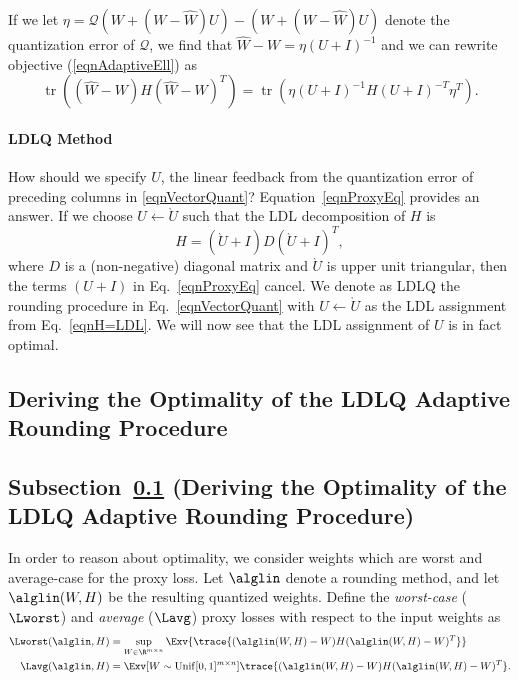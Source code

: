 If we let $\eta = \mathcal{Q}( W + (W - \hat W) U) - ( W + (W - \hat W) U)$ denote the quantization error of $\mathcal{Q}$, we find that $\hat W - W = \eta (U + I)^{-1}$ and we can rewrite objective (\ref{eqnAdaptiveEll}) as
\begin{equation}
    \label{eqnProxyEq}
    \operatorname{tr}((\hat W - W) H (\hat W - W)^T)
    =
    \operatorname{tr}(\eta (U + I)^{-1} H (U + I)^{-T}  \eta^T ).
\end{equation}

\paragraph{LDLQ Method}
How should we specify $U$, the linear feedback from the quantization error of preceding columns in \eqref{eqnVectorQuant}?
Equation~\ref{eqnProxyEq} provides an answer.
If we choose $U \gets \grave U$ such that the LDL decomposition of $H$ is 
\begin{equation}
    \label{eqnH=LDL}
    H = (\grave U + I) D (\grave U + I)^T,
\end{equation}
where $D$ is a (non-negative) diagonal matrix and $\grave U$ is upper unit triangular, then the terms $(U + I)$ in Eq.~\eqref{eqnProxyEq} cancel.
We denote as LDLQ the rounding procedure in Eq.~\eqref{eqnVectorQuant} with $U \gets \grave U$ as the LDL assignment from Eq.~\eqref{eqnH=LDL}. 
We will now see that the LDL assignment of $U$ is in fact optimal. 


\newcommand{\titleLDLQopt}{Deriving the Optimality of the LDLQ Adaptive Rounding Procedure} %
\subsection{\titleLDLQopt}\label{secLDLopt}
\begin{toappendix}
\subsection*{Subsection~\ref{secLDLopt} (\titleLDLQopt)} %
\end{toappendix}

In order to reason about optimality, 
we consider weights which are worst and average-case for the proxy loss.
Let $\alglin$ denote a rounding method,
and let $\alglin(W,H)$ be the resulting quantized weights.
Define the \emph{worst-case} ($\Lworst$) and \emph{average} ($\Lavg$) proxy losses with respect to the input weights as
\begin{align}
    \Lworst(\alglin, H) &= \sup_{W \in \R^{m \times n}} \Exv{ \trace{ ( \alglin(W, H) - W) H (\alglin(W, H) - W)^T } } 
    \label{eqnLworst}\\
    \Lavg(\alglin, H)  &= \Exv[{W \sim \operatorname{Unif}[0,1]^{m \times n}}]{ \trace{ ( \alglin(W, H) - W) H (\alglin(W, H) - W)^T } }.
    \label{eqnLavg}
\end{align}

